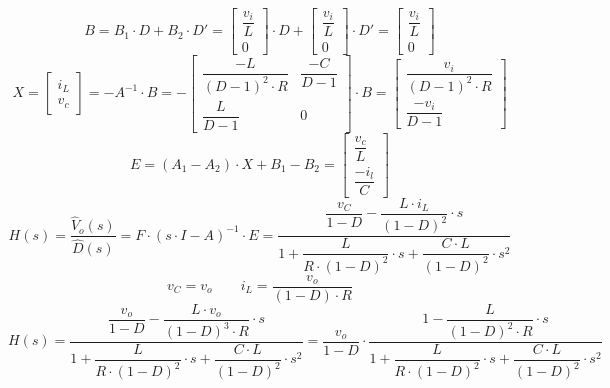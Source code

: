 \documentclass[a4paper,11pt,fleqn]{article}
\begin{document}
\[ B = B_1 \cdot D + B_2 \cdot D'
     = \begin{bmatrix}
            \dfrac{v_i}{L} \\
            0
        \end{bmatrix}
     \cdot D 
     + \begin{bmatrix}
            \dfrac{v_i}{L} \\
            0
        \end{bmatrix}
     \cdot D'
     = \begin{bmatrix}
            \dfrac{v_i}{L} \\
            0
        \end{bmatrix}
\]
\[ X = \begin{bmatrix}i_L\\v_c\end{bmatrix} = -A^{-1} \cdot B 
     = -\begin{bmatrix}
            \dfrac{-L}{(D - 1)^2 \cdot R} & \dfrac{-C}{D - 1} \\
            \dfrac{L}{D-1} & 0
        \end{bmatrix} \cdot B
     = \begin{bmatrix}
            \dfrac{v_i}{(D - 1)^2 \cdot R} \\
            \dfrac{-v_i}{D-1}
        \end{bmatrix}
\]
\[ E = (A_1 - A_2) \cdot X + B_1 - B_2
     = \begin{bmatrix}
            \dfrac{v_c}{L} \\
            \dfrac{-i_l}{C}
        \end{bmatrix}
\]
\[ H(s) = \dfrac{\hat{V}_o(s)}{\hat{D}(s)} = F \cdot (s \cdot I - A)^{-1} \cdot E
    = \dfrac{\dfrac{v_C}{1 - D} - \dfrac{L \cdot i_L}{(1 - D)^2} \cdot s}
        {1 + \dfrac{L}{R \cdot (1 - D)^2} \cdot s + \dfrac{C \cdot L}{(1 - D)^2} \cdot s^2}
\]
\[ v_C = v_o \qquad i_L = \dfrac{v_o}{(1 - D) \cdot R} \]
\[ H(s) = \dfrac{\dfrac{v_o}{1 - D} - \dfrac{L \cdot v_o}{(1 - D)^3 \cdot R} \cdot s}
        {1 + \dfrac{L}{R \cdot (1 - D)^2} \cdot s + \dfrac{C \cdot L}{(1 - D)^2} \cdot s^2}
    = \dfrac{v_o}{1 - D} \cdot \dfrac{1 - \dfrac{L}{(1 - D)^2 \cdot R} \cdot s}
        {1 + \dfrac{L}{R \cdot (1 - D)^2} \cdot s + \dfrac{C \cdot L}{(1 - D)^2} \cdot s^2}
\]

\clearpage
\end{document}
